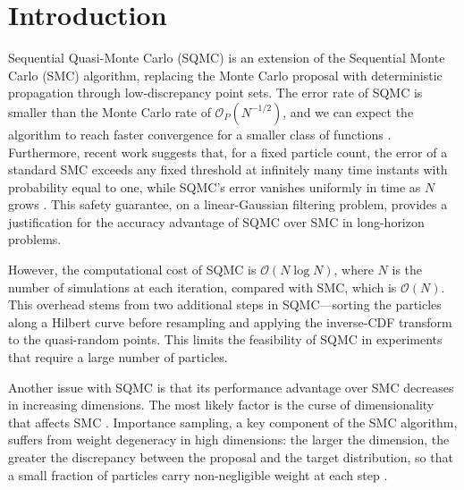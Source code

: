 \chapter{Introduction}

Sequential Quasi-Monte Carlo (SQMC) is an extension of the Sequential Monte Carlo (SMC) algorithm, replacing the Monte Carlo proposal with deterministic propagation through low-discrepancy point sets. The error rate of SQMC is smaller than the Monte Carlo rate of $\mathcal{O}_P (N^{-1/2})$, and we can expect the algorithm to reach faster convergence for a smaller class of functions \citep{chopingerber2015sqmc}. Furthermore, recent work suggests that, for a fixed particle count, the error of a standard SMC exceeds any fixed threshold at infinitely many time instants with probability equal to one, while SQMC's error vanishes uniformly in time as $N$ grows \citep{gerber2026}. This safety guarantee, on a linear-Gaussian filtering problem, provides a justification for the accuracy advantage of SQMC over SMC in long-horizon problems. 

However, the computational cost of SQMC is $\mathcal{O}(N \log N)$, where $N$ is the number of simulations at each iteration, compared with SMC, which is $\mathcal{O}(N)$. This overhead stems from two additional steps in SQMC---sorting the particles along a Hilbert curve before resampling and applying the inverse-CDF transform to the quasi-random points. This limits the feasibility of SQMC in experiments that require a large number of particles.

Another issue with SQMC is that its performance advantage over SMC decreases in increasing dimensions. The most likely factor is the curse of dimensionality that affects SMC \citep{chopingerber2017sqmcintroduction}. Importance sampling, a key component of the SMC algorithm, suffers from weight degeneracy in high dimensions: the larger the dimension, the greater the discrepancy between the proposal and the target distribution, so that a small fraction of particles carry non-negligible weight at each step \citep{snyderbengtssonbickel2008,bickellibengtsson2008}.

